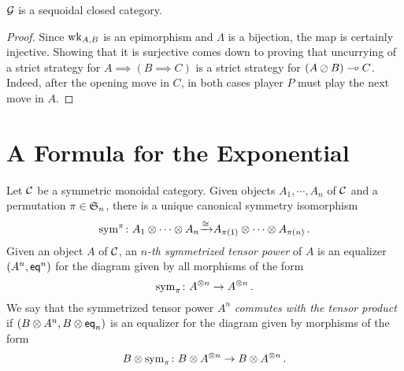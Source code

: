 \begin{proposition}
  $\G$ is a sequoidal closed category.
\end{proposition}
\begin{proof}
  Since $\wk_{A,B}$ is an epimorphism and $\Lambda$ is a bijection, the map is certainly injective.  
  Showing that it is surjective comes down to proving that uncurrying of a strict strategy for $A\implies (B \implies C)$ is a strict strategy for $(A\sequoid B) \implies C$.
  Indeed, after the opening move in $C$, in both cases player $P$ must play the next move in $A$.
\end{proof}

\section{A Formula for the Exponential}

\begin{definition}
  Let $\C$ be a symmetric monoidal category.  
  Given objects $A_1,\cdots,A_n$ of $\C$ and a permutation $\pi\in \S_n$, there is a unique canonical symmetry isomorphism
  \[
    \sym^\pi \from A_1 \tensor \cdots \tensor A_n \toisom A_{\pi(1)} \tensor \cdots \tensor A_{\pi(n)}\,.
    \]
  Given an object $A$ of $\C$, an \emph{$n$-th symmetrized tensor power} of $A$ is an equalizer $(A^n,\eq^n)$ for the diagram given by all morphisms of the form
  \[
    \sym_\pi \from A ^{\tensor n} \to A ^{\tensor n}\,.
    \]
  We say that the symmetrized tensor power $A^n$ \emph{commutes with the tensor product} if $(B\tensor A^n,B\tensor \eq_n)$ is an equalizer for the diagram given by morphisms of the form
  \[
    B\tensor\sym_\pi \from B\tensor A ^{\tensor n} \to B\tensor A ^{\tensor n}\,.
    \]
\end{definition}

